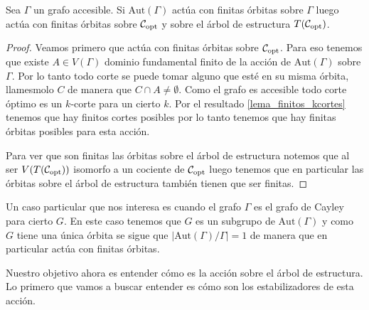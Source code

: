 \documentclass[tesis.tex]{subfiles}
\newcommand{\aut}{\text{Aut}}
\begin{document}
\begin{lema}\label{lema_finitas_orbitas}
	Sea $\Gamma$ un grafo accesible.
	Si $\aut(\Gamma)$ actúa con finitas órbitas sobre $\Gamma$ luego actúa con finitas órbitas sobre ${\cal C}_{\text{opt}}$ y sobre el árbol de estructura $T({\cal C}_{\text{opt}})$.
\end{lema} 
\begin{proof}
	Veamos primero que actúa con finitas órbitas sobre ${\cal C}_{\text{opt}}$.
	Para eso tenemos que existe $A \in V(\Gamma)$ dominio fundamental finito de la acción de $\aut(\Gamma)$ sobre $\Gamma$.
	Por lo tanto todo corte se puede tomar alguno que esté en su misma órbita, llamesmolo $C$ de manera que $C \cap A \neq \emptyset$.
	Como el grafo es accesible todo corte óptimo es un $k$-corte para un cierto $k$.
	Por el resultado \ref{lema_finitos_kcortes} tenemos que hay finitos cortes posibles por lo tanto tenemos que hay finitas órbitas posibles para esta acción.
	
	Para ver que son finitas las órbitas sobre el árbol de estructura notemos que al ser $V(T({\cal C}_{\text{opt}}))$ isomorfo a un cociente de ${\cal C}_{\text{opt}}$ luego tenemos que en particular las órbitas sobre el árbol de estructura también tienen que ser finitas.
\end{proof}

\begin{obs}
	Un caso particular que nos interesa es cuando el grafo $\Gamma$ es el grafo de Cayley para cierto \fg $G$.
	En este caso tenemos que $G$ es un subgrupo de $\aut(\Gamma)$ y como $G$ tiene una única órbita se sigue que $|\aut(\Gamma)/\Gamma| = 1$ de manera que en particular actúa con finitas órbitas.		
\end{obs}

Nuestro objetivo ahora es entender cómo es la acción sobre el árbol de estructura. 
Lo primero que vamos a buscar entender es cómo son los estabilizadores de esta acción.
\end{document}
